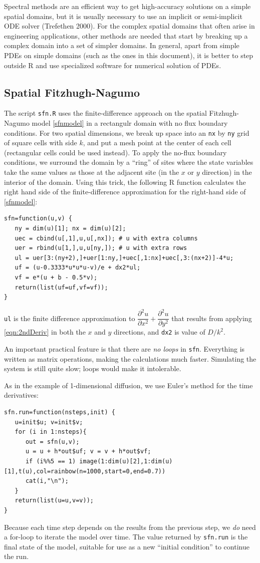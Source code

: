 \documentclass [11pt]{article}
\def\n{\mathbf{n}}
\newcommand{\blst}{\vspace{-0.035in} \begin{lstlisting}}
\newcommand{\ttt}[1]{\texttt{#1}}
\numberwithin{exercise}{section}
\def\R{R }
\begin{document}
Spectral methods are an efficient way to get high-accuracy solutions on a simple spatial domains,  
but it is usually necessary to use an implicit or semi-implicit ODE solver (Trefethen 2000). 
For the complex spatial domains that often arise in engineering applications, other methods are needed that start 
by breaking up a complex domain into a set of simpler domains. In general, apart from simple PDEs on simple domains  
(such as the ones in this document), it is better to step outside \R and use 
specialized software for numerical solution of PDEs. 

\subsection{Spatial Fitzhugh-Nagumo}
The script \texttt{sfn.R} uses the finite-difference approach on the spatial Fitzhugh-Nagumo model
\eqref{sfnmodel} in a rectangulr domain with no flux boundary conditions. For two spatial dimensions, 
we break up space into an \ttt{nx} by \ttt{ny} grid of square cells with side $k$, and put a mesh point at the center of each cell
(rectangular cells could be used instead). To apply the no-flux boundary conditions, we surround the domain by a ``ring'' of sites where the
state variables take the same values as those at the adjacent site (in the $x$ or $y$ direction) in the interior of the domain. 
Using this trick, the following \R function calculates the right hand side of the finite-difference approximation for 
the right-hand side of \eqref{sfnmodel}:
\blst
sfn=function(u,v) {
   ny = dim(u)[1]; nx = dim(u)[2];
   uec = cbind(u[,1],u,u[,nx]); # u with extra columns
   uer = rbind(u[1,],u,u[ny,]); # u with extra rows 
   ul = uer[3:(ny+2),]+uer[1:ny,]+uec[,1:nx]+uec[,3:(nx+2)]-4*u;
   uf = (u-0.3333*u*u*u-v)/e + dx2*ul;
   vf = e*(u + b - 0.5*v);
   return(list(uf=uf,vf=vf)); 
} 
\end{lstlisting}
\ttt{ul} is the finite difference approximation to  $\dfrac{\partial^2 u}{\partial x^2}  + \dfrac{\partial^2 u}{\partial y^2}$ that
results from applying \eqref{eqn:2ndDeriv} in both the $x$ and $y$ directions, and \texttt{dx2} is value of $D/k^2$.  

An important practical feature is that there are \textit{no loops} in \ttt{sfn}. 
Everything is written as matrix operations, making the calculations much faster. 
Simulating the system is still quite slow; loops would make it intolerable. 

As in the example of 1-dimensional diffusion, we use Euler's method for the time derivatives:
\blst
sfn.run=function(nsteps,init) {
   u=init$u; v=init$v; 
   for (i in 1:nsteps){
      out = sfn(u,v);
      u = u + h*out$uf;	v = v + h*out$vf;
      if (i%
      cat(i,"\n"); 
   }
   return(list(u=u,v=v)); 
}
\end{lstlisting} 
Because each time step depends on the results from the previous step, we \textit{do} need a for-loop to 
iterate the model over time. The value returned by \ttt{sfn.run} is the final state of the model, suitable for use as 
a new ``initial condition'' to continue the run. 
\end{document}
